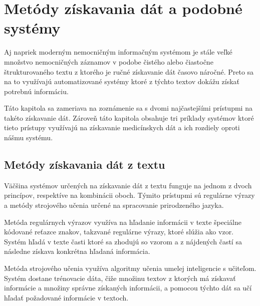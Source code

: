 \chapter{Metódy získavania dát a podobné systémy}

Aj napriek moderným nemocničným informačným
systémom je stále veľké množstvo nemocničných záznamov v
podobe čistého alebo čiastočne štrukturovaného 
textu z ktorého je ručné získavanie dát časovo náročné.
Preto sa na to využívajú automatizované systémy ktoré z týchto textov dokážu získať potrebnú informáciu. 

Táto kapitola sa zameriava na zoznámenie sa s dvomi najčastejšími prístupmi na takéto získavanie dát. Zároveň táto kapitola obsahuje tri príklady systémov ktoré tieto prístupy využívajú na získavanie medicínskych dát a ich rozdiely oproti nášmu systému.

\section{Metódy získavania dát z textu}


Väčšina systémov určených na získavanie dát z textu funguje na jednom z dvoch princípov, 
respektíve na kombinácii oboch. Týmito prístupmi
sú regulárne výrazy a metódy strojového učenia
určené na spracovanie prirodzeného jazyka.

Metóda regulárnych výrazov využíva na hľadanie informácii v texte
špeciálne kódované reťazce znakov, takzvané regulárne výrazy, ktoré slúžia ako vzor. 
Systém hľadá v texte časti ktoré sa zhodujú so vzorom a z 
nájdených častí sa následne získava konkrétna hľadaná informácia.

Metóda strojového učenia využíva algoritmy učenia umelej inteligencie s učiteľom. Systém dostane trénovacie dáta, čiže množinu textov z ktorých má získavať informácie a množiny správne získaných informácii, a pomocou týchto dát sa učí hľadať požadované informácie v textoch. 

